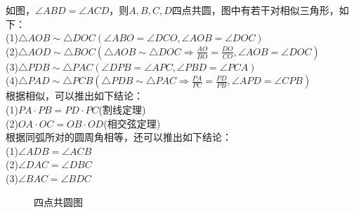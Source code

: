 \begin{definition}
    如图，$\angle ABD=\angle ACD$，则$A,B,C,D$四点共圆，图中有若干对相似三角形，如下：\\
    (1)$\triangle AOB \sim \triangle DOC (\angle ABO=\angle DCO, \angle AOB=\angle DOC)$ \\
    (2)$\triangle AOD \sim \triangle BOC (\triangle AOB \sim \triangle DOC \Rightarrow \frac{AO}{BO}=\frac{DO}{CO}, \angle AOB=\angle DOC)$ \\
    (3)$\triangle PDB \sim \triangle PAC (\angle DPB=\angle APC, \angle PBD=\angle PCA)$ \\
    (4)$\triangle PAD \sim \triangle PCB (\triangle PDB \sim \triangle PAC \Rightarrow \frac{PA}{PC}=\frac{PD}{PB}, \angle APD=\angle CPB)$ \\
    根据相似，可以推出如下结论： \\
    (1)$PA·PB=PD·PC$(割线定理) \\
    (2)$OA·OC=OB·OD$(相交弦定理) \\
    根据同弧所对的圆周角相等，还可以推出如下结论：\\
    (1)$\angle ADB=\angle ACB$ \\
    (2)$\angle DAC=\angle DBC$ \\
    (3)$\angle BAC=\angle BDC$ \\
\end{definition}
\begin{figure}[H]
    \centering
    \resizebox{4cm}{!}{}
    \caption{四点共圆图}
\end{figure}

